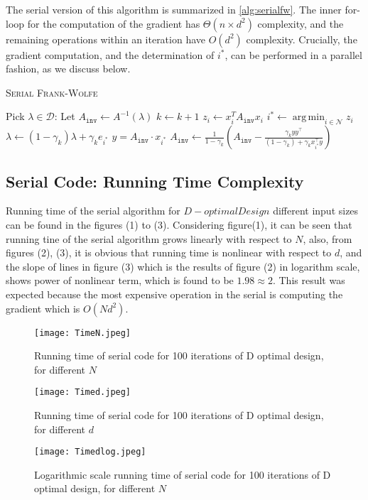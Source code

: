 \documentclass[11pt, oneside]{article}
\newcommand{\argmin}{\mathop{\arg\,\min}}
\begin{document}
The serial version of this algorithm is summarized in \eqref{alg:serialfw}. The inner for-loop for the computation of the gradient has $\Theta(n\times d^2)$ complexity, and the remaining operations within an iteration have $O(d^2)$ complexity. Crucially, the gradient computation, and the determination of $i^*$, can be performed in a parallel fashion, as we discuss below.
\begin{algorithm}[t]
\begin{small}
  \caption{\textsc{Serial Frank-Wolfe}}\label{alg:serialfw}
  \begin{algorithmic}[1]
   \STATE Pick $\lambda\in \mathcal{D}$:
   \STATE Let $A_{\texttt{inv}} \leftarrow A^{-1}(\lambda)$
     \STATE $k\leftarrow k+1$
     \STATE $z_i \leftarrow x_i^T A_{\texttt{inv}} x_i$
    \ENDFOR
    \STATE $i^* \leftarrow \argmin_{i\in \mathcal{N}} z_i$
    \STATE $\lambda\leftarrow (1-\gamma_k) \lambda + \gamma_k e_{i^*} $
    \STATE $y = A_{\texttt{inv}} \cdot x_{i^*}$
    \STATE $A_{\texttt{inv}} \leftarrow \frac{1}{1-\gamma_k} \left(A_{\texttt{inv}} - \frac{\gamma_k y y^\top}{(1-\gamma_k)+ \gamma_k x_{i^*}^\top y} \right) $ 
  \ENDWHILE
  \end{algorithmic}
\end{small}
\end{algorithm}




\subsection{Serial Code: Running Time Complexity}
Running time of the serial algorithm for $D-optimal Design$ different input sizes can be found in the figures (1) to (3). Considering figure(1), it can be seen that running tine of the serial algorithm grows linearly with respect to $N$, also, from figures (2), (3), it is obvious that running time is nonlinear with respect to $d$, and the slope of lines in figure (3) which is the results of figure (2) in logarithm scale, shows power of nonlinear term, which is found to be $1.98{\approx}2$. This result was expected because  the most expensive operation in the serial is computing the gradient which is $O(Nd^2)$.  

 \begin{figure}[h!]
    \texttt{[image: TimeN.jpeg]}
    \caption{Running time of serial code for 100 iterations of D optimal design, for different $N$}
    \label{fig:f1}
    \end{figure}
 \begin{figure}[h!]
    \texttt{[image: Timed.jpeg]}
    \caption{Running time of serial code for 100 iterations of D optimal design, for different $d$}
    \label{fig:f1}
    \end{figure}    
 \begin{figure}[h!]
    \texttt{[image: Timedlog.jpeg]}
    \caption{Logarithmic scale running time of serial code for 100 iterations of D optimal design, for different $N$}
    \label{fig:f1}
    \end{figure}
\end{document}
